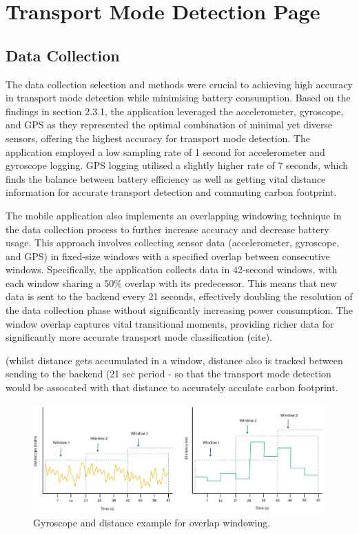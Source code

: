 \documentclass{l4proj}
\begin{document}
\section{Transport Mode Detection Page}

\subsection{Data Collection}

The data collection selection and methods were crucial to achieving high accuracy in transport mode detection while minimising battery consumption. 
Based on the findings in section 2.3.1, the application leveraged the accelerometer, gyroscope, and GPS as they represented the optimal combination of minimal yet diverse sensors, offering the highest accuracy for transport mode detection. The application employed a low sampling rate of 1 second for accelerometer and gyroscope logging. GPS logging utilised a slightly higher rate of 7 seconds, which finds the balance between battery efficiency as well as getting vital distance information for accurate transport detection and commuting carbon footprint.

The mobile application also implements an overlapping windowing technique in the data collection process to further increase accuracy and decrease battery usage. This approach involves collecting sensor data (accelerometer, gyroscope, and GPS) in fixed-size windows with a specified overlap between consecutive windows. Specifically, the application collects data in 42-second windows, with each window sharing a 50\% overlap with its predecessor. This means that new data is sent to the backend every 21 seconds, effectively doubling the resolution of the data collection phase without significantly increasing power consumption. The window overlap captures vital transitional moments, providing richer data for significantly more accurate transport mode classification (cite). 

(whilst distance gets accumulated in a window, distance also is tracked between sending to the backend (21 sec period - so that the transport mode detection would be assocated with that distance to accurately acculate carbon footprint.

\begin{figure}[ht]
  \centering
  \includegraphics[width=\linewidth]{images/overlap windowing.png}
  \caption{Gyroscope and distance example for overlap windowing.}
  \label{fig:overlapWindowing}
\end{figure}
\end{document}
